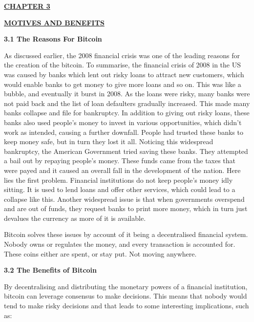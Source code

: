 \documentclass[12pt,a4paper]{report}
\begin{document}
\begin{flushleft}
\newpage
 
\begin{center}\underline{  \Large\textbf{CHAPTER 3}}\end{center}
\begin{center}\underline{ \Large \textbf{MOTIVES AND BENEFITS}}\end{center}

\vspace{10mm}
\textbf{3.1 The Reasons For Bitcoin}
\vspace{10mm}

As discussed earlier, the 2008 financial crisis was one of the leading reasons for the creation of the bitcoin. 
To summarise, the financial crisis of 2008 in the US was caused by banks which lent out risky loans to attract new customers, which would enable banks to get money to give more loans and so on. This was like a bubble, and eventually it burst in 2008. As the loans were risky, many banks were not paid back and the list of loan defaulters gradually increased. This made many banks collapse and file for bankruptcy. In addition to giving out risky loans, these banks also used people’s money to invest in various opportunities, which didn't work as intended, causing a further downfall.
\vspace{10mm}
People had trusted these banks to keep money safe, but in turn they lost it all. Noticing this widespread bankruptcy, the American Government tried saving these banks. They attempted a bail out by repaying people's money. These funds came from the taxes that were payed and it caused an overall fall in the development of the nation.
Here lies the first problem. Financial institutions do not keep people's money idly sitting. It is used to lend loans and offer other services, which could lead to a collapse like this.
Another widespread issue is that when governments overspend and are out of funds, they request banks to print more money, which in turn just devalues the currency as more of it is available.
\vspace{10mm}

Bitcoin solves these issues by account of it being a decentralised financial system. Nobody owns or regulates the money, and every transaction is accounted for.  These coins either are spent, or stay put. Not moving anywhere.

\newpage
\vspace{10mm}
\textbf{3.2 The Benefits of Bitcoin}
\vspace{10mm}

By decentralising and distributing the monetary powers of a financial institution, bitcoin can leverage consensus to make decisions. This means that nobody would tend to make risky decisions and that leads to some interesting implications, such as:


\end{flushleft}
\end{document}
